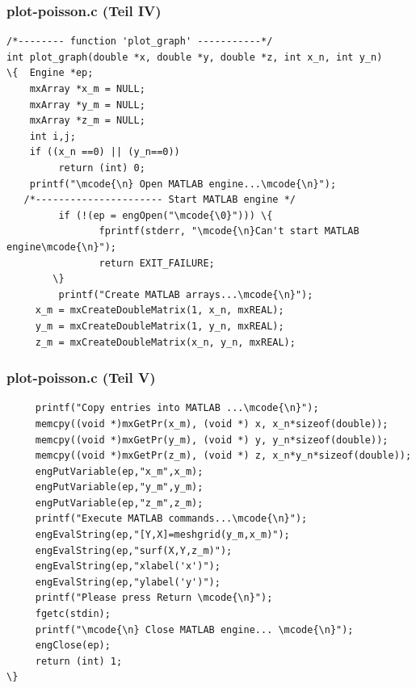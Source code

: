 %
%
\begin{frame}[fragile]\frametitle{plot-poisson.c (Teil IV)}
\vspace*{-0.3cm}
\begin{lstlisting}
/*-------- function 'plot_graph' -----------*/
int plot_graph(double *x, double *y, double *z, int x_n, int y_n)
\{  Engine *ep;
    mxArray *x_m = NULL;
    mxArray *y_m = NULL;
    mxArray *z_m = NULL;
    int i,j;
    if ((x_n ==0) || (y_n==0)) 
         return (int) 0;
    printf("\mcode{\n} Open MATLAB engine...\mcode{\n}");
   /*---------------------- Start MATLAB engine */
         if (!(ep = engOpen("\mcode{\0}"))) \{
                fprintf(stderr, "\mcode{\n}Can't start MATLAB engine\mcode{\n}");
                return EXIT_FAILURE;
        \}
         printf("Create MATLAB arrays...\mcode{\n}");
     x_m = mxCreateDoubleMatrix(1, x_n, mxREAL);
     y_m = mxCreateDoubleMatrix(1, y_n, mxREAL);
     z_m = mxCreateDoubleMatrix(x_n, y_n, mxREAL);
\end{lstlisting}
\end{frame}
%
%
\begin{frame}[fragile]\frametitle{plot-poisson.c (Teil V)}
\begin{lstlisting}     
     printf("Copy entries into MATLAB ...\mcode{\n}");
     memcpy((void *)mxGetPr(x_m), (void *) x, x_n*sizeof(double));
     memcpy((void *)mxGetPr(y_m), (void *) y, y_n*sizeof(double));
     memcpy((void *)mxGetPr(z_m), (void *) z, x_n*y_n*sizeof(double));      
     engPutVariable(ep,"x_m",x_m);
     engPutVariable(ep,"y_m",y_m);
     engPutVariable(ep,"z_m",z_m);     
     printf("Execute MATLAB commands...\mcode{\n}");
     engEvalString(ep,"[Y,X]=meshgrid(y_m,x_m)");
     engEvalString(ep,"surf(X,Y,z_m)");
     engEvalString(ep,"xlabel('x')");
     engEvalString(ep,"ylabel('y')"); 
     printf("Please press Return \mcode{\n}");
     fgetc(stdin);  
     printf("\mcode{\n} Close MATLAB engine... \mcode{\n}");
     engClose(ep);
     return (int) 1;
\}  
\end{lstlisting}
\end{frame}

